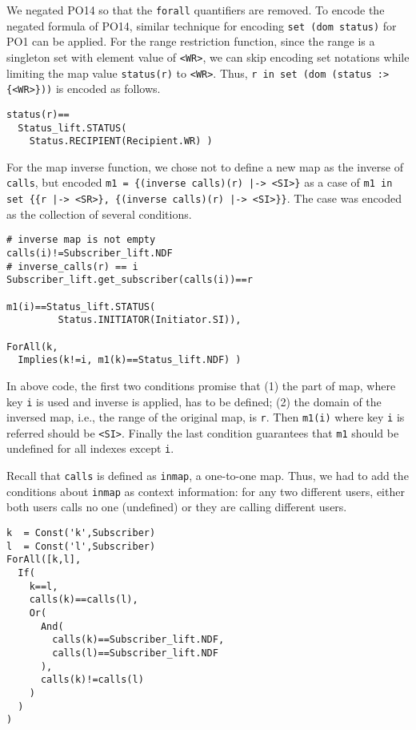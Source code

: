 We negated PO14 so that the {\tt forall} quantifiers are removed. To encode the negated formula of PO14, similar technique for  encoding {\tt set (dom status)} for PO1 can be applied. For the range restriction function, since the range is a singleton set with element value of {\tt <WR>}, we can skip encoding set notations while limiting the map value {\tt status(r)} to {\tt <WR>}. Thus, {\tt r in set (dom (status :> \{<WR>\}))} is encoded as follows.

\begin{mdframed}[roundcorner=5pt,shadow=true]
\begin{Verbatim}[fontsize=\small]
status(r)==
  Status_lift.STATUS(
    Status.RECIPIENT(Recipient.WR) )
\end{Verbatim}
\end{mdframed}

For the map inverse function, we chose not to define a new map as the inverse of {\tt calls}, but encoded {\tt m1 = \{(inverse calls)(r) |-> <SI>\}} as a case of {\tt m1 in set \{\{r |-> <SR>\}, \{(inverse calls)(r) |-> <SI>\}\}}. The case was encoded as the collection of several conditions. 

\begin{mdframed}[roundcorner=5pt,shadow=true]
\begin{Verbatim}[fontsize=\small]
# inverse map is not empty
calls(i)!=Subscriber_lift.NDF 
# inverse_calls(r) == i
Subscriber_lift.get_subscriber(calls(i))==r

m1(i)==Status_lift.STATUS(
         Status.INITIATOR(Initiator.SI)),

ForAll(k, 
  Implies(k!=i, m1(k)==Status_lift.NDF) )
\end{Verbatim}
\end{mdframed}

In above code, the first two conditions promise that (1) the part of map, where key {\tt i} is used and inverse is applied, has to be defined; (2) the domain of the inversed map, i.e., the range of the original map, is {\tt r}. Then {\tt m1(i)} where key {\tt i} is referred should be {\tt <SI>}. Finally the last condition guarantees that {\tt m1} should be undefined for all indexes except {\tt i}.

Recall that {\tt calls} is defined as {\tt inmap}, a one-to-one map. Thus, we had to add  the conditions about {\tt inmap} as context information: for any two different users, either both users calls no one (undefined) or they are calling different users.

\begin{mdframed}[roundcorner=5pt,shadow=true]
\begin{Verbatim}[fontsize=\small]
k  = Const('k',Subscriber)
l  = Const('l',Subscriber)
ForAll([k,l],
  If(
    k==l,
    calls(k)==calls(l),
    Or(
      And(
        calls(k)==Subscriber_lift.NDF,
        calls(l)==Subscriber_lift.NDF
      ),
      calls(k)!=calls(l)
    )
  )
)
\end{Verbatim}
\end{mdframed}
\medskip

